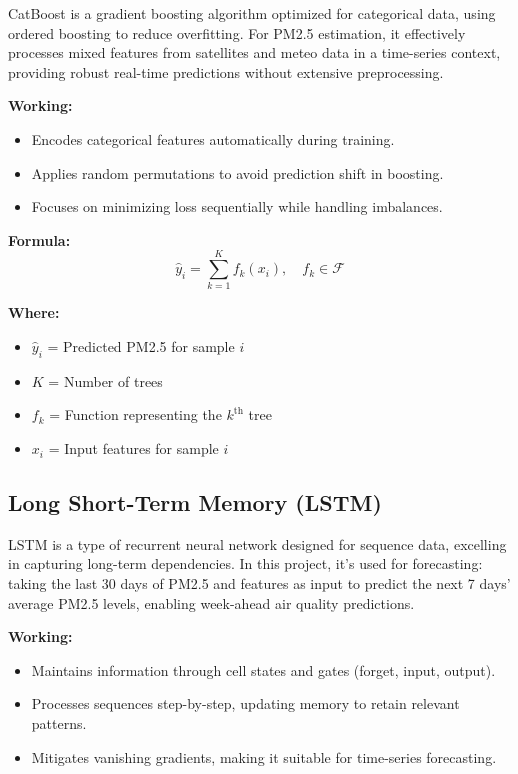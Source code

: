 \documentclass[12pt]{report}
\begin{document}
CatBoost is a gradient boosting algorithm optimized for categorical data, using ordered boosting to reduce overfitting. For PM2.5 estimation, it effectively processes mixed features from satellites and meteo data in a time-series context, providing robust real-time predictions without extensive preprocessing.

\noindent\textbf{Working:}
\begin{itemize}
    \item Encodes categorical features automatically during training.
    \item Applies random permutations to avoid prediction shift in boosting.
    \item Focuses on minimizing loss sequentially while handling imbalances.
\end{itemize}

\noindent\textbf{Formula:}
\[
\hat{y}_i = \sum_{k=1}^{K} f_k(x_i), \quad f_k \in \mathcal{F}
\]

\noindent\textbf{Where:}
\begin{itemize}
    \item $\hat{y}_i$ = Predicted PM2.5 for sample $i$
    \item $K$ = Number of trees
    \item $f_k$ = Function representing the $k^{\text{th}}$ tree
    \item $x_i$ = Input features for sample $i$
\end{itemize}

\subsection{Long Short-Term Memory (LSTM)}

LSTM is a type of recurrent neural network designed for sequence data, excelling in capturing long-term dependencies. In this project, it's used for forecasting: taking the last 30 days of PM2.5 and features as input to predict the next 7 days' average PM2.5 levels, enabling week-ahead air quality predictions.

\noindent\textbf{Working:}
\begin{itemize}
    \item Maintains information through cell states and gates (forget, input, output).
    \item Processes sequences step-by-step, updating memory to retain relevant patterns.
    \item Mitigates vanishing gradients, making it suitable for time-series forecasting.
\end{itemize}
\end{document}
